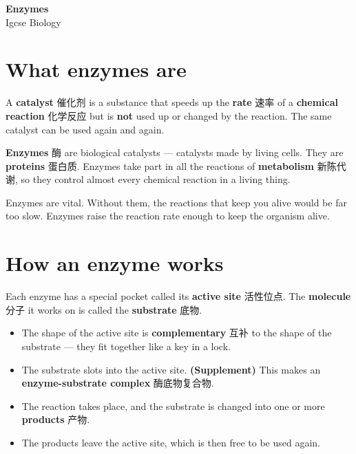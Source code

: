 \documentclass[11pt]{article}
\begin{document}
\begin{center}
  {\LARGE\bfseries Enzymes}\\[0.35em]
  {\large Igcse Biology}
\end{center}
\vspace{0.6em}

\section*{What enzymes are}

A \textbf{catalyst} 催化剂 is a substance that speeds up the \textbf{rate} 速率 of a \textbf{chemical reaction} 化学反应 but is \textbf{not} used up or changed by the reaction. The same catalyst can be used again and again.

\textbf{Enzymes} 酶 are biological catalysts — catalysts made by living cells. They are \textbf{proteins} 蛋白质. Enzymes take part in all the reactions of \textbf{metabolism} 新陈代谢, so they control almost every chemical reaction in a living thing.

Enzymes are vital. Without them, the reactions that keep you alive would be far too slow. Enzymes raise the reaction rate enough to keep the organism alive.

\section*{How an enzyme works}

Each enzyme has a special pocket called its \textbf{active site} 活性位点. The \textbf{molecule} 分子 it works on is called the \textbf{substrate} 底物.

\begin{itemize}
\item The shape of the active site is \textbf{complementary} 互补 to the shape of the substrate — they fit together like a key in a lock.

\item The substrate slots into the active site. \textbf{(Supplement)} This makes an \textbf{enzyme-substrate complex} 酶底物复合物.

\item The reaction takes place, and the substrate is changed into one or more \textbf{products} 产物.

\item The products leave the active site, which is then free to be used again.

\end{itemize}
\end{document}
